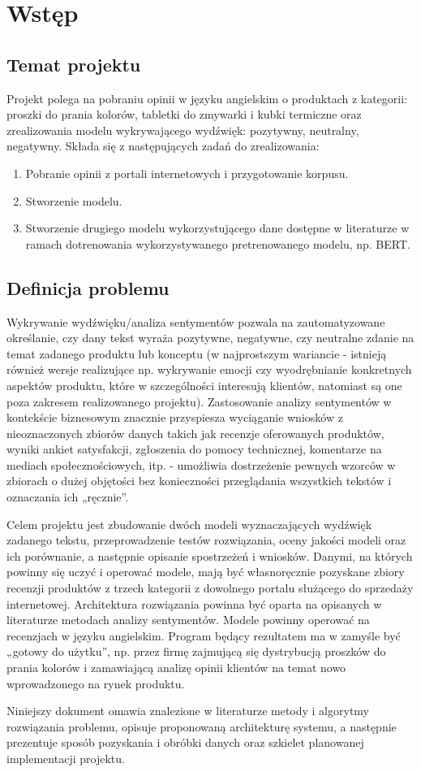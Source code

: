 \newpage
\section{Wstęp}

\subsection{Temat projektu}

Projekt polega na pobraniu opinii w języku angielskim o produktach z kategorii: proszki do prania kolorów, tabletki do zmywarki i kubki termiczne oraz zrealizowania modelu wykrywającego wydźwięk: pozytywny, neutralny, negatywny. Składa się z następujących zadań do zrealizowania:
\begin{enumerate}
    \item Pobranie opinii z portali internetowych i przygotowanie korpusu.
    \item Stworzenie modelu.
    \item Stworzenie drugiego modelu wykorzystującego dane dostępne w literaturze w ramach dotrenowania wykorzystywanego pretrenowanego modelu, np. BERT.
\end{enumerate}

\subsection{Definicja problemu}

Wykrywanie wydźwięku/analiza sentymentów pozwala na zautomatyzowane określanie, czy dany tekst wyraża pozytywne, negatywne, czy neutralne zdanie na temat zadanego produktu lub konceptu (w najprostszym wariancie - istnieją również wersje realizujące np. wykrywanie emocji czy wyodrębnianie konkretnych aspektów produktu, które w szczególności interesują klientów, natomiast są one poza zakresem realizowanego projektu). Zastosowanie analizy sentymentów w kontekście biznesowym znacznie przyspiesza wyciąganie wniosków z nieoznaczonych zbiorów danych takich jak recenzje oferowanych produktów, wyniki ankiet satysfakcji, zgłoszenia do pomocy technicznej, komentarze na mediach społecznościowych, itp. - umożliwia dostrzeżenie pewnych wzorców w zbiorach o dużej objętości bez konieczności przeglądania wszystkich tekstów i oznaczania ich „ręcznie”.

Celem projektu jest zbudowanie dwóch modeli wyznaczających wydźwięk zadanego tekstu, przeprowadzenie testów rozwiązania, oceny jakości modeli oraz ich porównanie, a następnie opisanie spostrzeżeń i wniosków. Danymi, na których powinny się uczyć i operować modele, mają być własnoręcznie pozyskane zbiory recenzji produktów z trzech kategorii z dowolnego portalu służącego do sprzedaży internetowej. Architektura rozwiązania powinna być oparta na opisanych w literaturze metodach analizy sentymentów. Modele powinny operować na recenzjach w języku angielskim. Program będący rezultatem ma w zamyśle być „gotowy do użytku”, np. przez firmę zajmującą się dystrybucją proszków do prania kolorów i zamawiającą analizę opinii klientów na temat nowo wprowadzonego na rynek produktu.

Niniejszy dokument omawia znalezione w literaturze metody i algorytmy rozwiązania problemu, opisuje proponowaną architekturę systemu, a następnie prezentuje sposób pozyskania i obróbki danych oraz szkielet planowanej implementacji projektu.